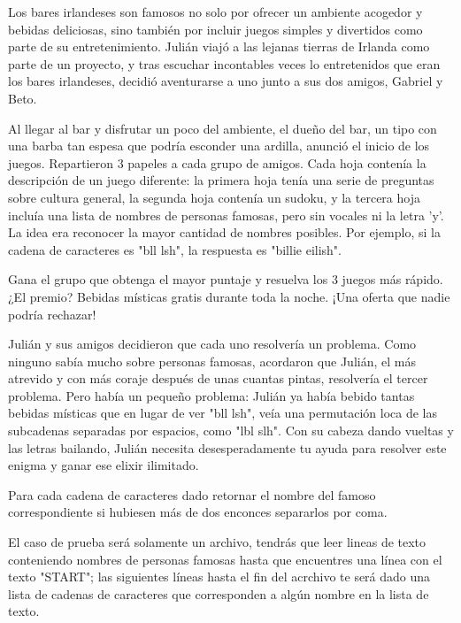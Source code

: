 
Los bares irlandeses son famosos no solo por ofrecer un ambiente acogedor y bebidas deliciosas, sino también por incluir juegos simples y divertidos como parte de su entretenimiento. Julián viajó a las lejanas tierras de Irlanda como parte de un proyecto, y tras escuchar incontables veces lo entretenidos que eran los bares irlandeses, decidió aventurarse a uno junto a sus dos amigos, Gabriel y Beto.

Al llegar al bar y disfrutar un poco del ambiente, el dueño del bar, un tipo con una barba tan espesa que podría esconder una ardilla, anunció el inicio de los juegos. Repartieron $3$ papeles a cada grupo de amigos. Cada hoja contenía la descripción de un juego diferente: la primera hoja tenía una serie de preguntas sobre cultura general, la segunda hoja contenía un sudoku, y la tercera hoja incluía una lista de nombres de personas famosas, pero sin vocales ni la letra 'y'. La idea era reconocer la mayor cantidad de nombres posibles. Por ejemplo, si la cadena de caracteres es "bll lsh", la respuesta es "billie eilish".

Gana el grupo que obtenga el mayor puntaje y resuelva los 3 juegos más rápido. ¿El premio? Bebidas místicas gratis durante toda la noche. ¡Una oferta que nadie podría rechazar!

Julián y sus amigos decidieron que cada uno resolvería un problema. Como ninguno sabía mucho sobre personas famosas, acordaron que Julián, el más atrevido y con más coraje después de unas cuantas pintas, resolvería el tercer problema. Pero había un pequeño problema: Julián ya había bebido tantas bebidas místicas que en lugar de ver "bll lsh", veía una permutación loca de las subcadenas separadas por espacios, como "lbl slh". Con su cabeza dando vueltas y las letras bailando, Julián necesita desesperadamente tu ayuda para resolver este enigma y ganar ese elixir ilimitado.

Para cada cadena de caracteres dado retornar el nombre del famoso correspondiente si hubiesen más de dos enconces separarlos por coma.





El caso de prueba será solamente un archivo, tendrás que leer lineas de texto conteniendo nombres de personas famosas hasta que encuentres una línea con el texto "START"; las siguientes líneas hasta el fin del acrchivo te será dado una lista de cadenas de caracteres que corresponden a algún nombre en la lista de texto.

